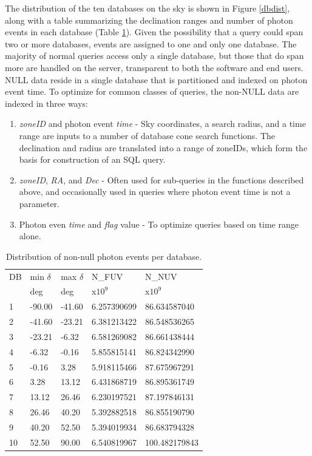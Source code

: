 \documentclass[trackchanges,preprint2]{aastex}
\begin{document}
The distribution of the ten databases on the sky is shown in Figure \ref{dbdist}, along with a table summarizing the declination ranges and number of photon events in each database (Table \ref{dbcounts}). Given the possibility that a query could span two or more databases, events are assigned to one and only one database. The majority of normal queries access only a single database, but those that do span more are handled on the server, transparent to both the software and end users.
	NULL data reside in a single database that is partitioned and indexed on photon event time. To optimize for common classes of queries, the non-NULL data are indexed in three ways:
\begin{enumerate}
	\item{\emph{zoneID} and photon event \emph{time} - Sky coordinates, a search radius, and a time range are inputs to a number of database cone search functions. The declination and radius are translated into a range of zoneIDs, which form the basis for construction of an SQL query.}
	\item{\emph{zoneID}, \emph{RA}, and \emph{Dec} - Often used for sub-queries in the functions described above, and occasionally used in queries where photon event time is not a parameter.}
	\item{Photon even \emph{time} and \emph{flag} value - To optimize queries based on time range alone.}
\end{enumerate}

\begin{table}[h!]
\caption{Distribution of non-null photon events per database.}
\begin{tabularx}{0.45\textwidth}{lllll}
\hline
DB & min $\delta$ & max $\delta$ & N\_FUV & N\_NUV\\
   & deg          & deg          & x$10^9$ & x$10^9$\\
\hline
1 & -90.00 & -41.60 &   6.257390699 &  86.634587040\\
2 & -41.60 & -23.21 &   6.381213422 &  86.548536265\\
3 & -23.21 &  -6.32 &   6.581269082 &  86.661438444\\
4 &  -6.32 &  -0.16 &   5.855815141 &  86.824342990\\
5 &  -0.16 &   3.28 &   5.918115466 &  87.675967291\\
6 &   3.28 &  13.12 &   6.431868719 &  86.895361749\\
7 &  13.12 &  26.46 &   6.230197521 &  87.197846131\\
8 &  26.46 &  40.20 &   5.392882518 &  86.855190790\\
9 &  40.20 &  52.50 &   5.394019934 &  86.683794328\\
10 &  52.50 &  90.00 &   6.540819967 & 100.482179843\\
\hline
\end{tabularx}
\label{dbcounts}
\end{table}
\end{document}
